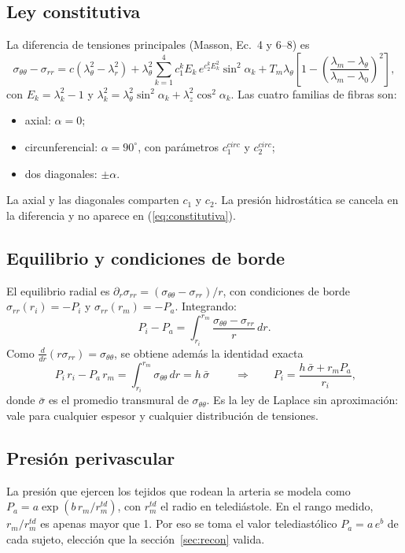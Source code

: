\documentclass[11pt,a4paper]{article}
\newcommand{\stt}{\sigma_{\theta\theta}}
\newcommand{\srr}{\sigma_{rr}}
\newcommand{\lt}{\lambda_\theta}
\begin{document}
\subsection{Ley constitutiva}
La diferencia de tensiones principales (Masson, Ec.~4 y 6--8) es
\begin{equation}
\stt-\srr=c\left(\lt^2-\lambda_r^2\right)+\lt^2\sum_{k=1}^{4}c_1^{k}E_k\,e^{c_2^{k}E_k^2}\sin^2\alpha_k
+T_m\lt\left[1-\left(\frac{\lambda_m-\lt}{\lambda_m-\lambda_0}\right)^2\right],
\label{eq:constitutiva}
\end{equation}
con $E_k=\lambda_k^2-1$ y $\lambda_k^2=\lt^2\sin^2\alpha_k+\lambda_z^2\cos^2\alpha_k$. Las cuatro familias de fibras son:
\begin{itemize}
\item axial: $\alpha=0$;
\item circunferencial: $\alpha=90^\circ$, con parámetros $c_1^{circ}$ y $c_2^{circ}$;
\item dos diagonales: $\pm\alpha$.
\end{itemize}
La axial y las diagonales comparten $c_1$ y $c_2$. La presión hidrostática se cancela en la diferencia y no aparece en (\ref{eq:constitutiva}).

\subsection{Equilibrio y condiciones de borde}
El equilibrio radial es $\partial_r\srr=(\stt-\srr)/r$, con condiciones de borde $\srr(r_i)=-P_i$ y $\srr(r_m)=-P_a$. Integrando:
\begin{equation}
P_i-P_a=\int_{r_i}^{r_m}\frac{\stt-\srr}{r}\,dr .
\label{eq:equilibrio}
\end{equation}
Como $\frac{d}{dr}(r\srr)=\stt$, se obtiene además la identidad exacta
\begin{equation}
\boxed{\;P_i\,r_i-P_a\,r_m=\int_{r_i}^{r_m}\stt\,dr=h\,\bar\sigma\;}
\qquad\Longrightarrow\qquad
P_i=\frac{h\,\bar\sigma+r_m P_a}{r_i},
\label{eq:identidad}
\end{equation}
donde $\bar\sigma$ es el promedio transmural de $\stt$. Es la ley de Laplace sin aproximación: vale para cualquier espesor y cualquier distribución de tensiones.

\subsection{Presión perivascular}
La presión que ejercen los tejidos que rodean la arteria se modela como $P_a=a\exp(b\,r_m/r_m^{td})$, con $r_m^{td}$ el radio en telediástole. En el rango medido, $r_m/r_m^{td}$ es apenas mayor que 1. Por eso se toma el valor telediastólico $P_a=a\,e^{b}$ de cada sujeto, elección que la sección~\ref{sec:recon} valida.
\end{document}
